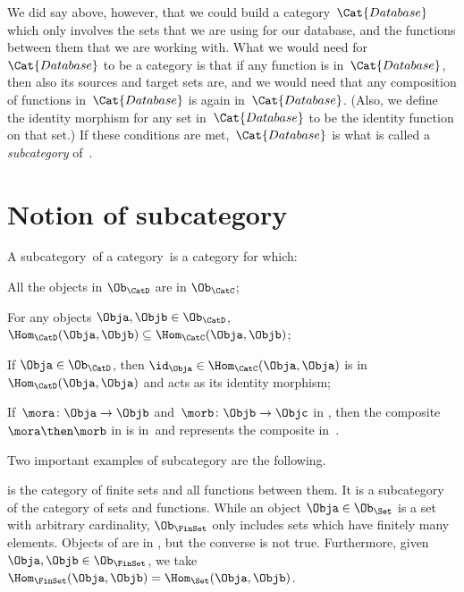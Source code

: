 We did say above, however, that we could build a category~$\Cat{Database}$ which only involves the sets that we are using for our database, and the functions between them that we are working with. What we would need for~$\Cat{Database}$ to be a category is that if any function is in~$\Cat{Database}$, then also its sources and target sets are, and we would need that any composition of functions in~$\Cat{Database}$ is again in~$\Cat{Database}$. (Also, we define the identity morphism for any set in~$\Cat{Database}$ to be the identity function on that set.) If these conditions are met,~$\Cat{Database}$ is what is called a \emph{subcategory} of~\Set.


\section{Notion of subcategory}
\begin{ctdefinition}[Subcategory]
\label{def:subcategory}
A subcategory~\CatD of a category~\CatC is a category for which:
\begin{compactenum}
    \item All the objects in $\Ob_\CatD$ are in $\Ob_\CatC$;
    \item For any objects $\Obja,\Objb\in \Ob_\CatD$, $\Hom_\CatD(\Obja,\Objb)\subseteq \Hom_\CatC(\Obja,\Objb)$;
    \item If $\Obja\in \Ob_\CatD$, then $\id_\Obja \in \Hom_\CatC(\Obja,\Obja)$ is in $\Hom_\CatD(\Obja,\Obja)$ and acts as its identity morphism;
    \item If~$\mora \colon \Obja \to \Objb$ and~$\morb\colon \Objb\to \Objc$ in \CatD, then the composite~$\mora \then \morb$ in \CatC is in~\CatD and represents the composite in~\CatD.
\end{compactenum}
\end{ctdefinition}

Two important examples of subcategory are the following.

\begin{example}
\FinSet is the category of finite sets and all functions between them. It is a subcategory of the category \Set of sets and functions. While an object $\Obja \in \Ob_\Set$ is a set with arbitrary cardinality, $\Ob_{\FinSet}$ only includes sets which have finitely many elements. Objects of \FinSet are in \Set, but the converse is not true. Furthermore, given $\Obja,\Objb\in \Ob_\FinSet$, we take $\Hom_{\FinSet}(\Obja,\Objb)=\Hom_{\Set}(\Obja,\Objb)$.
\end{example}


